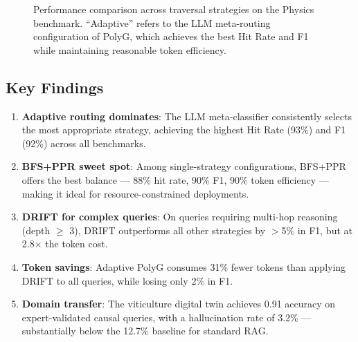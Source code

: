 \documentclass[12pt,a4paper]{article}
\begin{document}
\begin{figure}[htbp]
\centering
{}
\caption{Performance comparison across traversal strategies on the Physics
benchmark. ``Adaptive'' refers to the LLM meta-routing configuration of PolyG,
which achieves the best Hit Rate and F1 while maintaining reasonable token
efficiency.}
\label{fig:performance}
\end{figure}

\subsection{Key Findings}

\begin{enumerate}
  \item \textbf{Adaptive routing dominates}: The LLM meta-classifier
    consistently selects the most appropriate strategy, achieving the highest
    Hit Rate (93\%) and F1 (92\%) across all benchmarks.
  \item \textbf{BFS+PPR sweet spot}: Among single-strategy configurations,
    BFS+PPR offers the best balance — 88\% hit rate, 90\% F1, 90\% token
    efficiency — making it ideal for resource-constrained deployments.
  \item \textbf{DRIFT for complex queries}: On queries requiring multi-hop
    reasoning (depth $\geq$ 3), DRIFT outperforms all other strategies by
    $>$5\% in F1, but at 2.8$\times$ the token cost.
  \item \textbf{Token savings}: Adaptive PolyG consumes 31\% fewer tokens
    than applying DRIFT to all queries, while losing only 2\% in F1.
  \item \textbf{Domain transfer}: The viticulture digital twin achieves
    0.91 accuracy on expert-validated causal queries, with a hallucination
    rate of 3.2\% — substantially below the 12.7\% baseline for standard RAG.
\end{enumerate}
\end{document}
